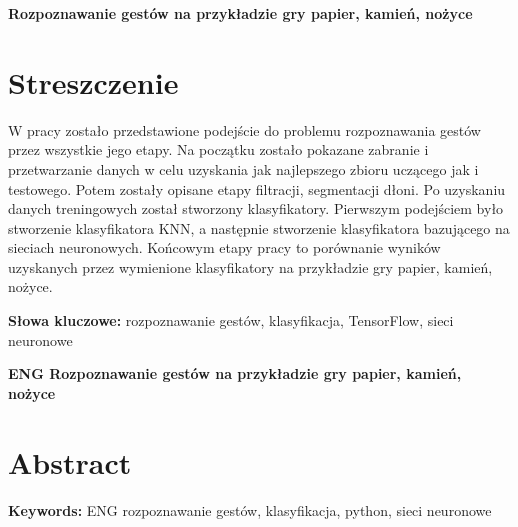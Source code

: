 \newpage
\begin{center}
\large \bf
Rozpoznawanie gestów na przykładzie gry papier, kamień, nożyce
\end{center}

\section*{Streszczenie}
W pracy zostało przedstawione podejście do problemu rozpoznawania gestów przez wszystkie jego etapy. Na początku zostało pokazane zabranie i przetwarzanie danych w celu uzyskania jak najlepszego zbioru uczącego jak i testowego. Potem zostały opisane etapy filtracji, segmentacji dłoni. Po uzyskaniu danych treningowych został stworzony klasyfikatory. Pierwszym podejściem było stworzenie klasyfikatora KNN, a następnie stworzenie klasyfikatora bazującego na sieciach neuronowych. Końcowym etapy pracy to porównanie wyników uzyskanych przez wymienione klasyfikatory na przykładzie gry papier, kamień, nożyce.

\bigskip
{\noindent\bf Słowa kluczowe:} rozpoznawanie gestów, klasyfikacja, TensorFlow, sieci neuronowe

\vskip 2cm


\begin{center}
\large \bf
ENG Rozpoznawanie gestów na przykładzie gry papier, kamień, nożyce
\end{center}

\section*{Abstract}

\bigskip
{\noindent\bf Keywords:} ENG rozpoznawanie gestów, klasyfikacja, python, sieci neuronowe

\vfill
